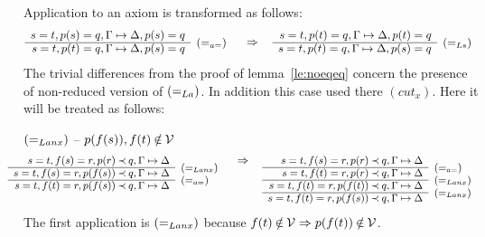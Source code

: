 \begin{PROOF}
Application to an axiom is transformed as follows:
\[\prarc{
s=t, p(s)=q,\GSD, p(s)=q \cl
s=t, p(t)=q,\GSD, p(s)=q & \rabove{\eae}
}\conv
\prarc{
s=t, p(t)=q,\GSD, p(t)=q \cl
s=t, p(t)=q,\GSD, p(s)=q & \rabove{\eLs}
}
\]
The trivial differences from the proof of lemma~\ref{le:noeqeq} concern the presence
of non-reduced version of $(=_{La})$. In addition this case used there
$(cut_x)$. Here it will be treated as follows:
\begin{LS}
\item $(=_{Lanx})$ -- $p(f(s)), f(t)\not\in\Vars$ \vspace*{-1ex}
\[\sma{ \prar{
s=t, f(s)=r, p(r)\Incl q, \GSD \cl
s=t, f(s)=r, p(f(s))\Incl q, \GSD & \rabove{\eLanx} \cl
s=t, f(t)=r, p(f(s))\Incl q, \GSD & \rabove{\eae}
}\conv
\prar{
s=t, f(s)=r, p(r)\Incl q, \GSD \cl
s=t, f(t)=r, p(r)\Incl q, \GSD & \rabove{\eae} \cl
s=t, f(t)=r, p(f(t))\Incl q, \GSD & \rabove{\eLanx} \cl
s=t, f(t)=r, p(f(s))\Incl q, \GSD & \rabove{\eLanx} 
} } %
\]
The first application is $(=_{Lanx})$ because $f(t)\not\in\Vars\impl p(f(t))\not\in\Vars$.


\end{LS}
\end{PROOF}
